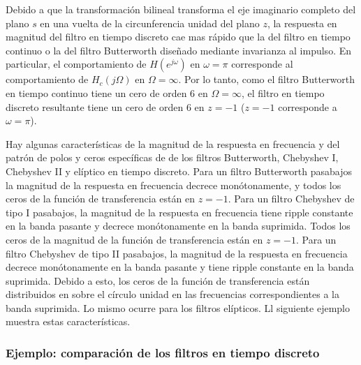 \documentclass[a4paper]{report}
\begin{document}
Debido a que la transformación bilineal transforma el eje imaginario completo del plano \(s\) en una vuelta de la circunferencia unidad del plano \(z\), la respuesta en magnitud del filtro en tiempo discreto cae mas rápido que la del filtro en tiempo continuo o la del filtro Butterworth diseñado mediante invarianza al impulso. En particular, el comportamiento de \(H(e^{j\omega})\) en \(\omega=\pi\) corresponde al comportamiento de \(H_c(j\Omega)\) en \(\Omega=\infty\). Por lo tanto, como el filtro Butterworth en tiempo continuo tiene un cero de orden 6 en \(\Omega=\infty\), el filtro en tiempo discreto resultante tiene un cero de orden 6 en \(z=-1\) (\(z=-1\) corresponde a \(\omega=\pi\)).

Hay algunas características de la magnitud de la respuesta en frecuencia y del patrón de polos y ceros específicas de de los filtros Butterworth, Chebyshev I, Chebyshev II y elíptico en tiempo discreto. Para un filtro Butterworth pasabajos la magnitud de la respuesta en frecuencia decrece monótonamente, y todos los ceros de la función de transferencia están en \(z=-1\). Para un filtro Chebyshev de tipo I pasabajos, la magnitud de la respuesta en frecuencia tiene ripple constante en la banda pasante y decrece monótonamente en la banda suprimida. Todos los ceros de la magnitud de la función de transferencia están en \(z=-1\). Para un filtro Chebyshev de tipo II pasabajos, la magnitud de la respuesta en frecuencia decrece monótonamente en la banda pasante y tiene ripple constante en la banda suprimida. Debido a esto, los ceros de la función de transferencia están distribuidos en sobre el círculo unidad en las frecuencias correspondientes a la banda suprimida. Lo mismo ocurre para los filtros elípticos. Ll siguiente ejemplo muestra estas características.

\subsubsection{Ejemplo: comparación de los filtros en tiempo discreto}
 
\end{document}
